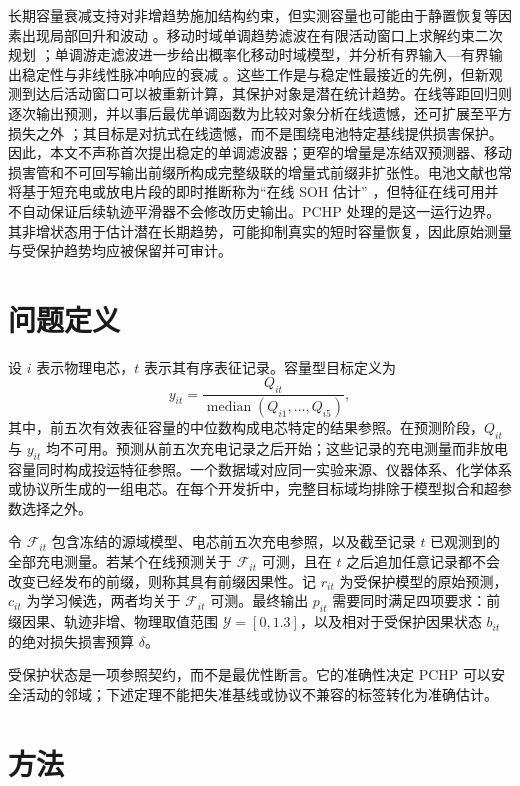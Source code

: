 \documentclass[UTF8,11pt]{ctexart}
\begin{document}
长期容量衰减支持对非增趋势施加结构约束，但实测容量也可能由于静置恢复等因素出现局部回升和波动 \citep{ma2021regeneration}。移动时域单调趋势滤波在有限活动窗口上求解约束二次规划 \citep{samar2004moving}；单调游走滤波进一步给出概率化移动时域模型，并分析有界输入—有界输出稳定性与非线性脉冲响应的衰减 \citep{gorinevsky2008efficient}。这些工作是与稳定性最接近的先例，但新观测到达后活动窗口可以被重新计算，其保护对象是潜在统计趋势。在线等距回归则逐次输出预测，并以事后最优单调函数为比较对象分析在线遗憾，还可扩展至平方损失之外 \citep{kotlowski2016online}；其目标是对抗式在线遗憾，而不是围绕电池特定基线提供损害保护。因此，本文不声称首次提出稳定的单调滤波器；更窄的增量是冻结双预测器、移动损害管和不可回写输出前缀所构成完整级联的增量式前缀非扩张性。电池文献也常将基于短充电或放电片段的即时推断称为“在线 SOH 估计” \citep{liu2020online}，但特征在线可用并不自动保证后续轨迹平滑器不会修改历史输出。PCHP 处理的是这一运行边界。其非增状态用于估计潜在长期趋势，可能抑制真实的短时容量恢复，因此原始测量与受保护趋势均应被保留并可审计。

\section{问题定义}

设 $i$ 表示物理电芯，$t$ 表示其有序表征记录。容量型目标定义为
\begin{equation}
  y_{it}=\frac{Q_{it}}{\operatorname{median}(Q_{i1},\ldots,Q_{i5})},
  \label{eq:soh_zh}
\end{equation}
其中，前五次有效表征容量的中位数构成电芯特定的结果参照。在预测阶段，$Q_{it}$ 与 $y_{it}$ 均不可用。预测从前五次充电记录之后开始；这些记录的充电测量而非放电容量同时构成投运特征参照。一个数据域对应同一实验来源、仪器体系、化学体系或协议所生成的一组电芯。在每个开发折中，完整目标域均排除于模型拟合和超参数选择之外。

令 $\mathcal F_{it}$ 包含冻结的源域模型、电芯前五次充电参照，以及截至记录 $t$ 已观测到的全部充电测量。若某个在线预测关于 $\mathcal F_{it}$ 可测，且在 $t$ 之后追加任意记录都不会改变已经发布的前缀，则称其具有前缀因果性。记 $r_{it}$ 为受保护模型的原始预测，$c_{it}$ 为学习候选，两者均关于 $\mathcal F_{it}$ 可测。最终输出 $p_{it}$ 需要同时满足四项要求：前缀因果、轨迹非增、物理取值范围 $\mathcal Y=[0,1.3]$，以及相对于受保护因果状态 $b_{it}$ 的绝对损失损害预算 $\delta$。

受保护状态是一项参照契约，而不是最优性断言。它的准确性决定 PCHP 可以安全活动的邻域；下述定理不能把失准基线或协议不兼容的标签转化为准确估计。

\section{方法}
\end{document}
